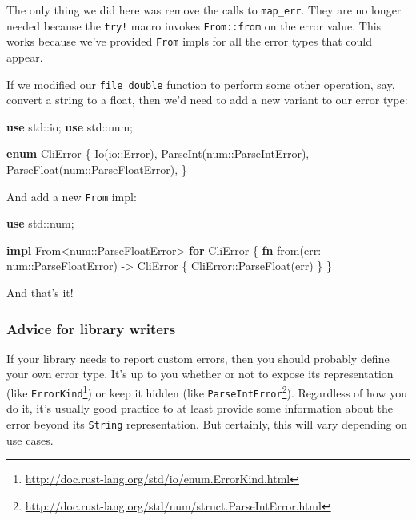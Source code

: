 \documentclass[a4paper,]{book}
\newenvironment{Shaded}{\begin{snugshade}}{\end{snugshade}}
\newcommand{\KeywordTok}[1]{\textcolor[rgb]{0.13,0.29,0.53}{\textbf{{#1}}}}
\newcommand{\NormalTok}[1]{{#1}}
\renewcommand{\href}[2]{#2\footnote{\url{#1}}}
\begin{document}
The only thing we did here was remove the calls to \texttt{map\_err}.
They are no longer needed because the \texttt{try!} macro invokes
\texttt{From::from} on the error value. This works because we've
provided \texttt{From} impls for all the error types that could appear.

If we modified our \texttt{file\_double} function to perform some other
operation, say, convert a string to a float, then we'd need to add a new
variant to our error type:

\begin{Shaded}
\begin{Highlighting}[]
\KeywordTok{use} \NormalTok{std::io;}
\KeywordTok{use} \NormalTok{std::num;}

\KeywordTok{enum} \NormalTok{CliError \{}
    \NormalTok{Io(io::Error),}
    \NormalTok{ParseInt(num::ParseIntError),}
    \NormalTok{ParseFloat(num::ParseFloatError),}
\NormalTok{\}}
\end{Highlighting}
\end{Shaded}

And add a new \texttt{From} impl:

\begin{Shaded}
\begin{Highlighting}[]

\KeywordTok{use} \NormalTok{std::num;}

\KeywordTok{impl} \NormalTok{From<num::ParseFloatError> }\KeywordTok{for} \NormalTok{CliError \{}
    \KeywordTok{fn} \NormalTok{from(err: num::ParseFloatError) -> CliError \{}
        \NormalTok{CliError::ParseFloat(err)}
    \NormalTok{\}}
\NormalTok{\}}
\end{Highlighting}
\end{Shaded}

And that's it!

\hypertarget{advice-for-library-writers}{\subsubsection{Advice for
library writers}\label{advice-for-library-writers}}

If your library needs to report custom errors, then you should probably
define your own error type. It's up to you whether or not to expose its
representation (like
\href{http://doc.rust-lang.org/std/io/enum.ErrorKind.html}{\texttt{ErrorKind}})
or keep it hidden (like
\href{http://doc.rust-lang.org/std/num/struct.ParseIntError.html}{\texttt{ParseIntError}}).
Regardless of how you do it, it's usually good practice to at least
provide some information about the error beyond its \texttt{String}
representation. But certainly, this will vary depending on use cases.
\end{document}
